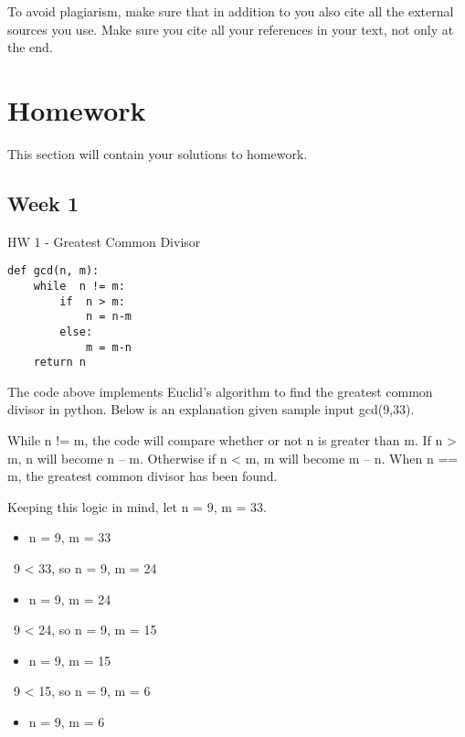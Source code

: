 \documentclass{article}
\theoremstyle{theorem}
\theoremstyle{definition}
\theoremstyle{remark}
\begin{document}
To avoid plagiarism, make sure that in addition to \cite{PL} you also cite all the external sources you use. Make sure you cite all your references in your text, not only at the end.

\section{Homework}\label{homework}

This section will contain your solutions to homework. 

\subsection{Week 1}

HW 1 - Greatest Common Divisor

\begin{lstlisting}
def gcd(n, m):
    while  n != m:
        if  n > m:
            n = n-m
        else:
            m = m-n
    return n 
\end{lstlisting}
%
The code above implements Euclid's algorithm to find the greatest common divisor in python. Below is an explanation given sample input gcd(9,33).

\medskip\noindent
While n != m, the code will compare whether or not n is greater than m. If n \textgreater{} m, n will become n -- m. Otherwise if n \textless{} m, m will become m -- n. When n == m, the greatest common divisor has been found.

\medskip\noindent
Keeping this logic in mind, let n = 9, m = 33.


\begin{itemize}
\item n = 9, m = 33
\end{itemize}

\medskip\indent\indent\
9 \textless{} 33, so n = 9, m = 24

\begin{itemize}
\item n = 9, m = 24
\end{itemize}

\medskip\indent\indent\
9 \textless{} 24, so n = 9, m = 15

\begin{itemize}
\item n = 9, m = 15
\end{itemize}

\medskip\indent\indent\
9 \textless{} 15, so n = 9, m = 6

\begin{itemize}
\item n = 9, m = 6
\end{itemize}
\end{document}
